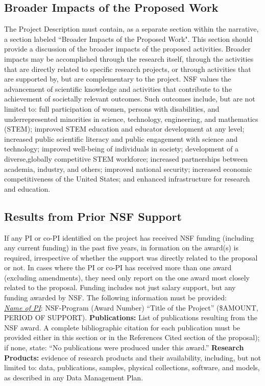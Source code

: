 \subsection{Broader Impacts of the Proposed Work}
The Project Description must contain, as a separate section within the narrative, a section labeled ``Broader
Impacts of the Proposed Work". This section should provide a discussion of the broader impacts of the proposed
activities. Broader impacts may be accomplished through the research itself, through the activities that are
directly related to specific research projects, or through activities that are supported by, but are complementary to 
the project. NSF values the advancement of scientific knowledge and activities that contribute to the
achievement of societally relevant outcomes. Such outcomes include, but are not limited to: full
participation of women, persons with disabilities, and underrepresented minorities in science, technology, engineering, and
mathematics (STEM); improved STEM education and educator development at any level; increased public
scientific literacy and public engagement with science and technology; improved well-being of individuals in
society; development of a diverse,globally competitive STEM workforce; increased partnerships between
academia, industry, and others; improved national security; increased economic competitiveness of the United
States; and enhanced infrastructure for research and education.

\subsection{Results from Prior NSF Support}
If any PI or co-PI identified on the project has received NSF funding (including any current
funding) in the past five years, in formation on the award(s) is required,
irrespective of whether the support was directly related to the proposal or not.
In cases where the PI or co-PI has received more than one award (excluding amendments),
they need only report on the one award most closely related to the proposal. Funding includes not just salary
support, but any funding awarded by NSF. The following information must be provided:\\

\noindent
\emph{\underline{Name of PI}}: NSF-Program (Award Number) ``Title of the Project'' (\$AMOUNT, PERIOD OF SUPPORT). 
{\bf Publications:} List of publications resulting from the NSF award. A complete bibliographic citation for each
publication must be provided either in this section or in the References Cited section of the proposal); if
none, state: ``No publications were produced under this award.'' {\bf Research Products:} evidence of research products 
and their availability, including, but not limited to: data, publications, samples, physical collections, software, 
and models, as described in any Data Management Plan.